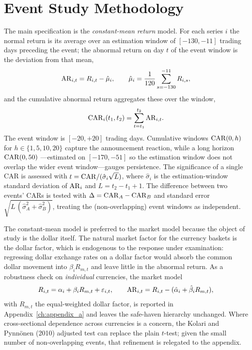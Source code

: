 \section{Event Study Methodology}
\label{sec:method_event}

The main specification is the \emph{constant-mean return} model. For each series $i$ the
normal return is its average over an estimation window of $[-130,-11]$ trading days
preceding the event; the abnormal return on day $t$ of the event window is the deviation
from that mean,
\begin{equation}
  \mathrm{AR}_{i,t} = R_{i,t} - \hat\mu_i, \qquad
  \hat\mu_i = \frac{1}{120}\sum_{s=-130}^{-11} R_{i,s},
\end{equation}
and the cumulative abnormal return aggregates these over the window,
\begin{equation}
  \mathrm{CAR}_i(t_1,t_2) = \sum_{t=t_1}^{t_2} \mathrm{AR}_{i,t}.
\end{equation}
The event window is $[-20,+20]$ trading days. Cumulative windows $\mathrm{CAR}(0,h)$ for
$h\in\{1,5,10,20\}$ capture the announcement reaction, while a long horizon $\mathrm{CAR}(0,50)$
---estimated on $[-170,-51]$ so the estimation window does not overlap the wider event
window---gauges persistence. The significance of a single CAR is assessed with
$t=\mathrm{CAR}/(\hat\sigma_i\sqrt{L})$, where $\hat\sigma_i$ is the estimation-window standard
deviation of $\mathrm{AR}_i$ and $L=t_2-t_1+1$. The difference between two events' CARs is tested
with $\Delta=\mathrm{CAR}_A-\mathrm{CAR}_B$ and standard error
$\sqrt{L\,(\hat\sigma_A^2+\hat\sigma_B^2)}$, treating the (non-overlapping) event windows
as independent.

The constant-mean model is preferred to the market model because the object of study is
the dollar itself. The natural market factor for the currency baskets is the dollar
factor, which is endogenous to the response under examination: regressing dollar exchange
rates on a dollar factor would absorb the common dollar movement into $\beta_i R_{m,t}$
and leave little in the abnormal return. As a robustness check on \emph{individual}
currencies, the market model
\begin{equation}
  R_{i,t} = \alpha_i + \beta_i R_{m,t} + \varepsilon_{i,t}, \qquad
  \mathrm{AR}_{i,t} = R_{i,t} - (\hat\alpha_i + \hat\beta_i R_{m,t}),
\end{equation}
with $R_{m,t}$ the equal-weighted dollar factor, is reported in
Appendix~\ref{ch:appendix_a} and leaves the safe-haven hierarchy unchanged. Where
cross-sectional dependence across currencies is a concern, the Kolari and Pynnönen (2010)
adjusted test can replace the plain $t$-test; given the small number of non-overlapping
events, that refinement is relegated to the appendix.


